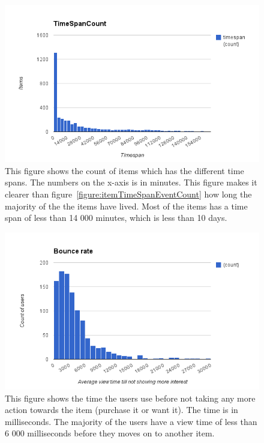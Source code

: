     \begin{figure}[H]
        \includegraphics[width=5in]{image/time-span-count.png}
        \centering
        \caption[Count of the different time spans of the items]{This figure shows the count of items which has the different time spans.
        The numbers on the x-axis is in minutes.
        This figure makes it clearer than figure~\ref{figure:itemTimeSpanEventCount} how long the majority of the the items have lived.
        Most of the items has a time span of less than 14 000 minutes, which is less than 10 days.}
    \end{figure}

    \begin{figure}[H]
        \includegraphics[width=5in]{image/bounceRate.png}
        \centering
        \caption[View time before leaving an item (Bounce Rate)]{This figure shows the time the users use before not taking any more action towards the item (purchase it or want it).
        The time is in milliseconds.
        The majority of the users have a view time of less than 6 000 milliseconds before they moves on to another item.}
        \label{figure:bounceRate}
    \end{figure}

